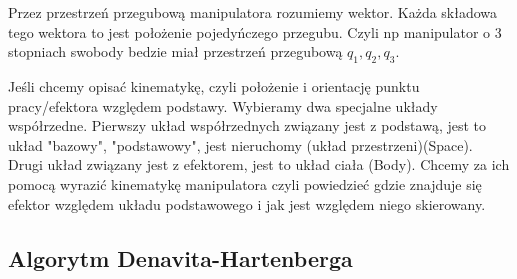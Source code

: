 \documentclass{article}
\begin{document}
Przez przestrzeń przegubową manipulatora rozumiemy wektor. Każda składowa tego wektora to jest położenie pojedyńczego przegubu. Czyli np manipulator o 3 stopniach swobody bedzie miał przestrzeń przegubową $q_{1}, q_{2}, q_{3}$.

Jeśli chcemy opisać kinematykę, czyli położenie i orientację punktu pracy/efektora względem podstawy. Wybieramy dwa specjalne układy współrzedne.
Pierwszy układ współrzednych związany jest z podstawą, jest to układ "bazowy", "podstawowy", jest nieruchomy (układ przestrzeni)(Space).
Drugi układ związany jest z efektorem, jest to układ ciała (Body).
Chcemy za ich pomocą wyrazić kinematykę manipulatora czyli powiedzieć gdzie znajduje się efektor względem układu podstawowego i jak jest względem niego skierowany.

\newpage

\subsection{Algorytm Denavita-Hartenberga}

\end{document}
